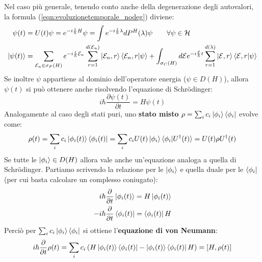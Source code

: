 \documentclass[../../FisicaTeorica.tex]{subfiles}
\begin{document}
Nel caso più generale, tenendo conto anche della degenerazione degli autovalori, la formula (\ref{eqn:evoluzionetemporale_nodeg}) diviene:
\begin{align}
    \psi(t)&=U(t)\psi = e^{-i\frac{t}{\hbar}H}\psi=\int e^{-i\frac{t}{\hbar}\lambda}dP^H(\lambda)\psi \qquad \forall \psi \in \mathcal{H}\nonumber\\
    \ket{\psi(t)} &= \sum_{\mathcal{E}_n\in \sigma_P(H)} e^{-i\frac{t}{\hbar}\mathcal{E}_n}\sum_{r=1}^{d(\mathcal{E}_n)}\ket{\mathcal{E}_{n},r}\braket{\mathcal{E}_{n},r|\psi}
+\int_{\sigma_C(H)}d\mathcal{E} e^{-i\frac{\mathcal{E}}{\hbar}t}\sum_{r=1}^{d(\lambda)}\ket{\mathcal{E},r}\braket{\mathcal{E},r|\psi}
\label{eqn:evoluzione_temporale_totale}
\end{align}
Se inoltre $\psi$ appartiene al dominio dell'operatore energia ($\psi \in D(H)$), allora $\psi(t)$ si può ottenere anche risolvendo l'equazione di Schrödinger:
\[
i\hbar \frac{\partial \psi(t)}{\partial t}=H\psi(t)
\]
Analogamente al caso degli stati puri,  uno \textbf{stato misto} $\rho=\sum_i c_i\ket{\phi_i}\bra{\phi_i}$ evolve come:
\[
\rho(t)=\sum_i c_i\ket{\phi_i(t)}\bra{\phi_i(t)}=\sum_i c_i U(t)\ket{\phi_i}\braket{\phi_i|U^\dag(t)}=U(t)\rho U^\dag(t)
\]
Se tutte le $\ket{\phi_i}\in D(H)$ allora vale anche un'equazione analoga a quella di Schrödinger. Partiamo scrivendo la relazione per le $\ket{\phi_i}$ e quella duale per le $\bra{\phi_i}$ (per cui basta calcolare un complesso coniugato):
\begin{align*}
i\hbar \frac{\partial}{\partial t}\ket{\phi_i(t)} &= H\ket{\phi_i(t)}\\
-i\hbar \frac{\partial}{\partial t}\bra{\phi_i(t)}&=\bra{\phi_i(t)}H
\end{align*}
Perciò per $\sum_i c_i \ket{\phi_i}\bra{\phi_i}$ si ottiene l'\textbf{equazione di von Neumann}:\\
\begin{equation}
i\hbar \frac{\partial}{\partial t}\rho(t) = \sum_i c_i\left(H\ket{\phi_i(t)}\bra{\phi_i(t)}-\ket{\phi_i(t)}\bra{\phi_i(t)}H \right) = [H,\rho(t)]
\end{equation}
\end{document}

